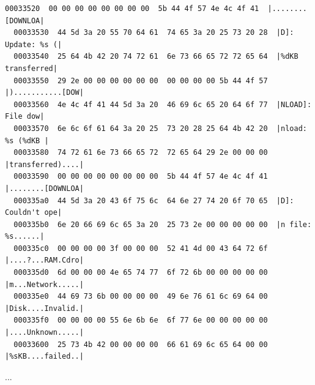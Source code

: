 \documentclass[]{project_plan}
\begin{document}
\begin{lstlisting}[basicstyle=\tiny]
  00033520  00 00 00 00 00 00 00 00  5b 44 4f 57 4e 4c 4f 41  |........[DOWNLOA|
  00033530  44 5d 3a 20 55 70 64 61  74 65 3a 20 25 73 20 28  |D]: Update: %s (|
  00033540  25 64 4b 42 20 74 72 61  6e 73 66 65 72 72 65 64  |%dKB transferred|
  00033550  29 2e 00 00 00 00 00 00  00 00 00 00 5b 44 4f 57  |)...........[DOW|
  00033560  4e 4c 4f 41 44 5d 3a 20  46 69 6c 65 20 64 6f 77  |NLOAD]: File dow|
  00033570  6e 6c 6f 61 64 3a 20 25  73 20 28 25 64 4b 42 20  |nload: %s (%dKB |
  00033580  74 72 61 6e 73 66 65 72  72 65 64 29 2e 00 00 00  |transferred)....|
  00033590  00 00 00 00 00 00 00 00  5b 44 4f 57 4e 4c 4f 41  |........[DOWNLOA|
  000335a0  44 5d 3a 20 43 6f 75 6c  64 6e 27 74 20 6f 70 65  |D]: Couldn't ope|
  000335b0  6e 20 66 69 6c 65 3a 20  25 73 2e 00 00 00 00 00  |n file: %s......|
  000335c0  00 00 00 00 3f 00 00 00  52 41 4d 00 43 64 72 6f  |....?...RAM.Cdro|
  000335d0  6d 00 00 00 4e 65 74 77  6f 72 6b 00 00 00 00 00  |m...Network.....|
  000335e0  44 69 73 6b 00 00 00 00  49 6e 76 61 6c 69 64 00  |Disk....Invalid.|
  000335f0  00 00 00 00 55 6e 6b 6e  6f 77 6e 00 00 00 00 00  |....Unknown.....|
  00033600  25 73 4b 42 00 00 00 00  66 61 69 6c 65 64 00 00  |%sKB....failed..|
\end{lstlisting}
...
\end{document}
